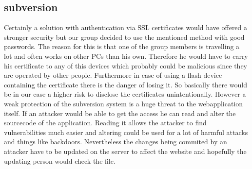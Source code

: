 \subsection{subversion}
\noindent
Certainly a solution with authentication via SSL certificates would have offered a stronger security but our group decided to use the mentioned method with good passwords. The reason for this is that one of the group members is travelling a lot and often works on other PCs than his own. Therefore he would have to carry his certificate to any of this devices which probably could be malicious since they are operated by other people. Furthermore in case of using a flash-device containing the certificate there is the danger of losing it.
So basically there would be in our case a higher risk to disclose the certificates unintentionally.
However a weak protection of the subversion system is a huge threat to the webapplication itself. If an attacker would be able to get the access he can read and alter the sourcecode of the application. Reading it allows the attacker to find vulnerabilities much easier and altering could be used for a lot of harmful attacks and things like backdoors. Nevertheless the changes being commited by an attacker have to be updated on the server to affect the website and hopefully the updating person would check the file.
